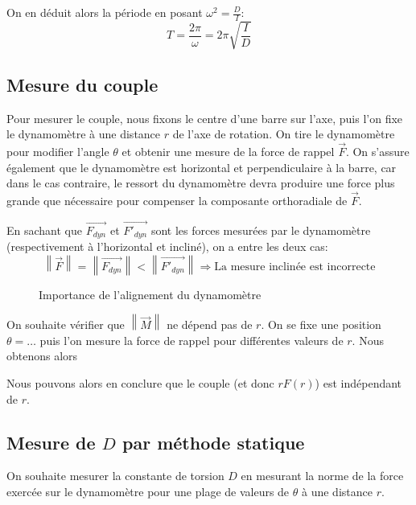 \documentclass[12pt]{article}
\begin{document}
On en déduit alors la période en posant $\omega^2 = \frac{D}{I}$:
\begin{equation}
    T = \frac{2\pi}{\omega} = 2\pi \sqrt{\frac{I}{D}}
\end{equation}


\subsection{Mesure du couple}
Pour mesurer le couple, nous fixons le centre d'une barre sur l'axe, puis l'on fixe le dynamomètre à une distance $r$
de l'axe de rotation. On tire le dynamomètre pour modifier l'angle $\theta$ et obtenir une mesure de la force de rappel $\vec{F}$.
On s'assure également que le dynamomètre est horizontal et perpendiculaire à la barre, car dans le cas contraire, le ressort du dynamomètre
devra produire une force plus grande que nécessaire pour compenser la composante orthoradiale de $\vec{F}$.

En sachant que $\vec{F_{dyn}}$ et $\vec{F'_{dyn}}$ sont les forces mesurées par le dynamomètre (respectivement à l'horizontal et incliné), on a entre les deux cas:
\begin{equation}
    \left\lVert \vec{F} \right\rVert = \left\lVert \vec{F_{dyn}} \right\rVert < \left\lVert \vec{F'_{dyn}} \right\rVert \Rightarrow \text{La mesure inclinée est incorrecte}
\end{equation}

\begin{figure}[!h]
    \begin{center}
        \resizebox{0.5\textwidth}{3cm}{
            
        }
    \end{center}
    \caption{Importance de l'alignement du dynamomètre}
    \label{fig:horizontal}
\end{figure}

On souhaite vérifier que $\left\lVert \vec{M} \right\rVert$ ne dépend pas de $r$. On se fixe une position $\theta = \dots$ puis l'on mesure la force de rappel pour différentes
valeurs de $r$. Nous obtenons alors

Nous pouvons alors en conclure que le couple (et donc $rF(r)$) est indépendant de $r$.

\subsection{Mesure de $D$ par méthode statique}

On souhaite mesurer la constante de torsion $D$ en mesurant la norme de la force exercée sur le dynamomètre 
pour une plage de valeurs de $\theta$ à une distance $r$.
\end{document}
